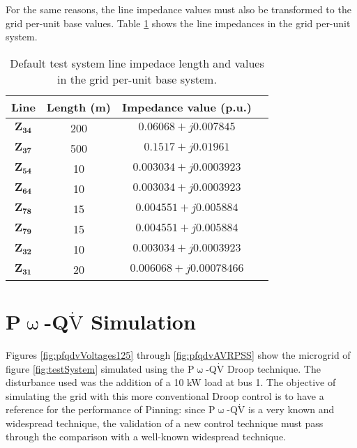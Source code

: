 	For the same reasons, the line impedance values must also be transformed to the grid per-unit base values. Table \ref{tab:lineImpedancesPU} shows the line impedances in the grid per-unit system.

\begingroup
\renewcommand*{\arraystretch}{1.3}
\renewcommand*{\tabcolsep}{2mm}
\begin{table}[h]
	\begin{center}
		\begin{tabular}{c c c c}
			\hline
			\textbf{Line} & \textbf{Length (m)} & \textbf{Impedance value (p.u.)} \\
			\hline
			$\mathbf{Z_{34}}$ & 200  & $0.06068 + j0.007845$ \\
			\hline
			$\mathbf{Z_{37}}$ & 500  & $0.1517 + j0.01961$ \\
			\hline
			$\mathbf{Z_{54}}$ & 10  & $0.003034 + j0.0003923$ \\
			\hline
			$\mathbf{Z_{64}}$ & 10  & $0.003034 + j0.0003923$ \\
			\hline
			$\mathbf{Z_{78}}$ & 15  & $0.004551 + j0.005884$ \\
			\hline
			$\mathbf{Z_{79}}$ & 15  & $0.004551 + j0.005884$ \\
			\hline
			$\mathbf{Z_{32}}$ & 10  & $0.003034 + j0.0003923$ \\
			\hline
			$\mathbf{Z_{31}}$ & 20  & $0.006068 + j0.00078466$ \\
			\hline
		\end{tabular}
		\caption{Default test system line impedace length and values in the grid per-unit base system.}
		\label{tab:lineImpedancesPU}
	\end{center}
\end{table}
\endgroup

\section{P$\upomega$-Q$\dot{\text{V}}$ Simulation} %

	Figures \eqref{fig:pfqdvVoltages125} through \eqref{fig:pfqdvAVRPSS} show the microgrid of figure \ref{fig:testSystem} simulated using the P$\upomega$-Q$\dot{\text{V}}$ Droop technique. The disturbance used was the addition of a 10 kW load at bus 1. The objective of simulating the grid with this more conventional Droop control is to have a reference for the performance of Pinning: since P$\upomega$-Q$\dot{\text{V}}$ is a very known and widespread technique, the validation of a new control technique must pass through the comparison with a well-known widespread technique.


